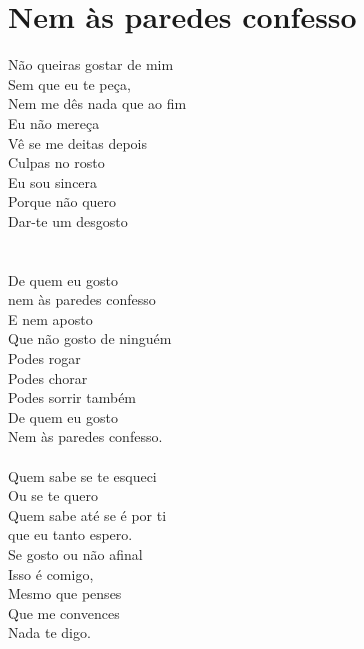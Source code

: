\documentclass{article}
\begin{document}
\section{ Nem às paredes confesso}
Não queiras gostar de mim\\
Sem que eu te peça,\\
Nem me dês nada que ao fim\\
Eu não mereça\\
Vê se me deitas depois\\
Culpas no rosto\\
Eu sou sincera\\
Porque não quero\\
Dar-te um desgosto\\
\\
[refrão:]\\
De quem eu gosto\\
nem às paredes confesso\\
E nem aposto\\
Que não gosto de ninguém\\
Podes rogar\\
Podes chorar\\
Podes sorrir também\\
De quem eu gosto\\
Nem às paredes confesso.\\
\\
Quem sabe se te esqueci\\
Ou se te quero\\
Quem sabe até se é por ti\\
que eu tanto espero.\\
Se gosto ou não afinal\\
Isso é comigo,\\
Mesmo que penses\\
Que me convences\\
Nada te digo.\\
\\
\end{document}
